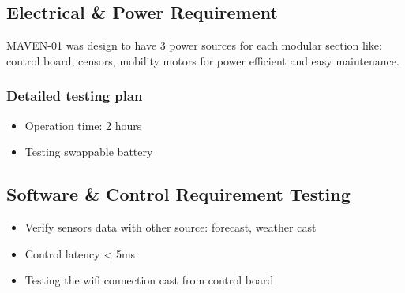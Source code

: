 \subsection{Electrical \& Power Requirement }
MAVEN-01 was design to have 3 power sources for each modular section like: control board, censors, mobility motors
for power efficient and easy maintenance. 

\subsubsection{Detailed testing plan}
\begin{itemize}
    \item Operation time: 2 hours
    \item Testing swappable battery 
\end{itemize}

\subsection{Software \& Control Requirement Testing}
\begin{itemize}
    \item Verify sensors data with other source: forecast, weather cast  
    \item Control latency < 5ms
    \item Testing the wifi connection cast from control board 
\end{itemize}



